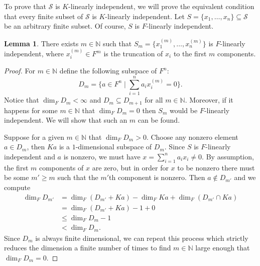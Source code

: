 \documentclass[12pt]{article}
\theoremstyle{definition}
\newtheorem{lemma}{Lemma}
\newcommand{\N}{\mathbb{N}}
\newcommand{\<}{\langle}
\renewcommand{\>}{\rangle}
\newcommand{\seq}{\subseteq}
\renewcommand{\_}[1]{{_{#1}}}
\begin{document}
To prove that $\mathcal{S}$ is $K$-linearly independent, we will prove the equivalent condition that every finite subset of $\mathcal{S}$ is $K$-linearly independent.
Let $S = \{x_1, \dots, x_n\} \seq \mathcal{S}$ be an arbitrary finite subset.
Of course, $S$ is $F$-linearly independent.

\begin{lemma}\label{lem:truncate}
    There exists $m \in \N$ such that $S_m = \{x_1^{(m)}, \dots, x_n^{(m)}\}$ is $F$-linearly independent, where $x_i^{(m)} \in F^m$ is the truncation of $x_i$ to the first $m$ components.
\end{lemma}

\begin{proof}
    For $m \in \N$ define the following subspace of $F^n$: 
    \[
        D_m = \{a \in F^n \mid \textstyle\sum_{i=1}^{n} a_i x_i^{(m)} = 0\}.
    \]
    Notice that $\dim_F D_m < \infty$ and $D_m \seq D_{m+1}$ for all $m \in \N$.
    Moreover, if it happens for some $m \in \N$ that $\dim_F D_m = 0$ then $S_m$ would be $F$-linearly independent.
    We will show that such an $m$ can be found.

    Suppose for a given $m \in \N$ that $\dim_F D_m > 0$.
    Choose any nonzero element $a \in D_m$, then $Ka$ is a $1$-dimensional subspace of $D_m$.
    Since $S$ is $F$-linearly independent and $a$ is nonzero, we must have $x = \sum_{i=1}^{n} a_i x_i \ne 0$.
    By assumption, the first $m$ components of $x$ are zero, but in order for $x$ to be nonzero there must be some $m' \geq m$ such that the $m'$th component is nonzero.
    Then $a \notin D_{m'}$ and we compute 
    \begin{align*}
        \dim_F D_{m'}
            &= \dim_F(D_{m'} + Ka) - \dim_F Ka + \dim_F(D_{m'} \cap Ka) \\
            &= \dim_F(D_{m'} + Ka) - 1 + 0 \\
            &\leq \dim_F D_m - 1 \\
            &< \dim_F D_m.
    \end{align*}
    Since $D_m$ is always finite dimensional, we can repeat this process which strictly reduces the dimension a finite number of times to find $m \in \N$ large enough that $\dim_F D_m = 0$.
\end{proof}
\end{document}
